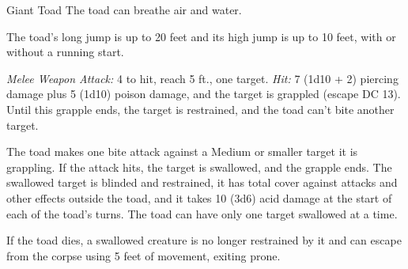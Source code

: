 \documentclass[10pt,a4paper,twoside,bg=print,twocolumn,openany,nodeprecatedcode]{dndbook}
\begin{document}
\begin{DndMonster}[float=t]{Giant Toad}
\DndMonsterBasics[
armor-class = {11},
hit-points = {\DndDice{6d10 + 6}},
speed = {20 ft., swim 40 ft.}
]
\DndMonsterAbilityScores[
 str = 15,
 dex = 13,
 con = 13,
 int = 2,
 wis = 10,
 cha = 3
]
\DndMonsterDetails[
senses = {darkvision 30 ft., passive perception 10},
challenge = 1,
]
The toad can breathe air and water.

The toad's long jump is up to 20 feet and its high jump is up to 10 feet, with or without a running start.

\textsl{Melee Weapon Attack:} 4 to hit, reach 5 ft., one target. \textsl{Hit:} 7 (1d10 + 2) piercing damage plus 5 (1d10) poison damage, and the target is grappled (escape DC 13). Until this grapple ends, the target is restrained, and the toad can't bite another target.

The toad makes one bite attack against a Medium or smaller target it is grappling. If the attack hits, the target is swallowed, and the grapple ends. The swallowed target is blinded and restrained, it has total cover against attacks and other effects outside the toad, and it takes 10 (3d6) acid damage at the start of each of the toad's turns. The toad can have only one target swallowed at a time.

If the toad dies, a swallowed creature is no longer restrained by it and can escape from the corpse using 5 feet of movement, exiting prone.

\end{DndMonster}
\end{document}

